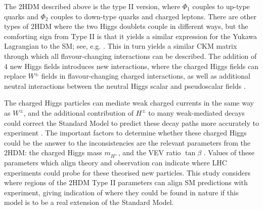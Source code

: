 \documentclass[a4paper,12pt]{article}
\begin{document}
The 2HDM described above is the type II version, where $\Phi_1$ couples to up-type quarks and $\Phi_2$ couples to down-type quarks and charged leptons. 
There are other types of 2HDM where the two Higgs doublets couple in different ways, but the comforting sign from Type II is that it yields a similar expression for the Yukawa Lagrangian to the SM; see, e.g. \cite{hunter}. 
This in turn yields a similar CKM matrix through which all flavour-changing interactions can be described. 
The addition of 4 new Higgs fields introduces new interactions, where the charged Higgs fields can replace $W^\pm$ fields in flavour-changing charged interactions, as well as additional neutral interactions between the neutral Higgs scalar and pseudoscalar fields \cite{branco}. 

The charged Higgs particles can mediate weak charged currents in the same way as $W^{\pm}$, and the additional contribution of $H^{\pm}$ to many weak-mediated decays could correct the Standard Model to predict these decay paths more accurately to experiment \cite{branco}. 
The important factors to determine whether these charged Higgs could be the answer to the inconsistencies are the relevant parameters from the 2HDM: the charged Higgs mass $m_{H^+}$, and the VEV ratio $\tan\beta$ \cite{desc}. 
Values of these parameters which align theory and observation can indicate where LHC experiments could probe for these theorised new particles. 
This study considers where regions of the 2HDM Type II parameters can align SM predictions with experiment, giving indication of where they could be found in nature if this model is to be a real extension of the Standard Model.
\end{document}

